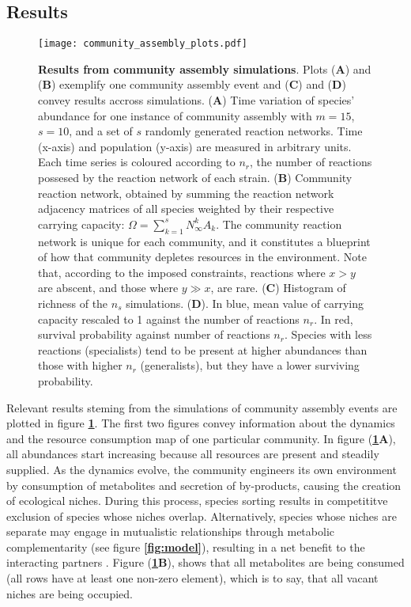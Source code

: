 \documentclass[titlepage,11pt]{article}
\begin{document}
\begin{linenumbers}
\begin{singlespace}
		\section{Results}
			\begin{figure}
				\centering			
				\texttt{[image: community\_assembly\_plots.pdf]}
				\caption{\textbf{Results from community assembly simulations}. Plots (\textbf{A}) and (\textbf{B}) exemplify one community assembly event and  (\textbf{C}) and (\textbf{D}) convey results accross simulations. (\textbf{A}) Time variation of species' abundance for one instance of community assembly with $ m = 15 $, $ s = 10 $, and a set of $ s $ randomly generated reaction networks. Time (x-axis) and population (y-axis) are measured in arbitrary units. Each time series is coloured according to $ n_r $, the number of reactions possesed by the reaction network of each strain. (\textbf{B}) Community reaction network, obtained by summing the reaction network adjacency matrices of all species weighted by their respective carrying capacity: $ \Omega = \sum_{k = 1}^{s} N^k_{\infty}A_k  $. The community reaction network is unique for each community, and it constitutes a blueprint of how that community depletes resources in the environment. Note that, according to the imposed constraints, reactions where $ x > y $ are abscent, and those where $ y \gg  x $, are rare. (\textbf{C}) Histogram of richness of the $ n_s $ simulations. (\textbf{D}). In blue, mean value of carrying capacity rescaled to 1 against the number of reactions $ n_r $. In red, survival probability against number of reactions $ n_r $. Species with less reactions (specialists) tend to be present at higher abundances than those with higher $ n_r $ (generalists), but they have a lower surviving probability.}
				\label{fig:community_assembly_results}
			\end{figure}
			Relevant results steming from the simulations of community assembly events are plotted in figure \textbf{\ref{fig:community_assembly_results}}. The first two figures convey information about the dynamics  and the resource consumption map of one particular community. In figure (\textbf{\ref{fig:community_assembly_results}A}), all abundances start increasing because all resources are present and steadily supplied. As the dynamics evolve, the community engineers its own environment by consumption of metabolites and secretion of by-products, causing the creation of ecological niches. During this process, species sorting results in competititve exclusion of species whose niches overlap. Alternatively, species whose niches are separate may engage in mutualistic relationships through metabolic complementarity (see figure \textbf{\ref{fig:model}}), resulting in a net benefit to the interacting partners \citep{Pascual-Garcia2020}. Figure (\textbf{\ref{fig:community_assembly_results}B}), shows that all metabolites are being consumed (all rows have at least one non-zero element), which is to say, that all vacant niches are being occupied.\\

\end{singlespace}
\end{linenumbers}
\end{document}
